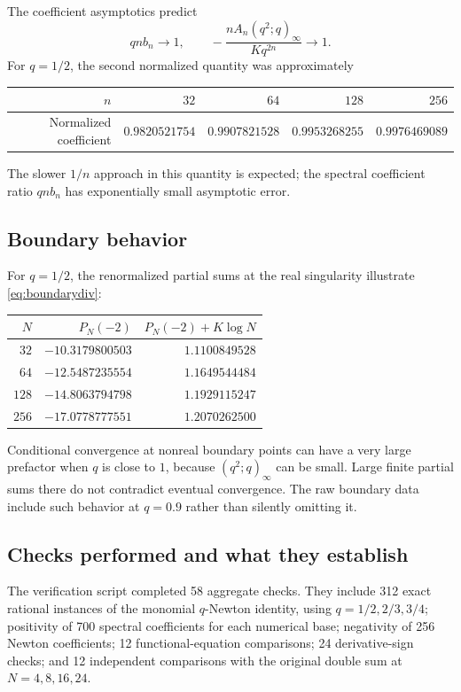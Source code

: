 \documentclass[11pt,letterpaper]{article}
\theoremstyle{definition}\newtheorem{definition}[theorem]{Definition}
\theoremstyle{remark}\newtheorem{remark}[theorem]{Remark}
\numberwithin{equation}{section}
\begin{document}
The coefficient asymptotics predict
\[
 qnb_n\longrightarrow1,\qquad
 -\frac{nA_n(q^2;q)_\infty}{Kq^{2n}}\longrightarrow1.
\]
For $q=1/2$, the second normalized quantity was approximately
\begin{center}
\begin{tabular}{@{}rrrrr@{}}
\toprule
$n$ & $32$ & $64$ & $128$ & $256$\\
\midrule
Normalized coefficient & $0.9820521754$ & $0.9907821528$ & $0.9953268255$ & $0.9976469089$\\
\bottomrule
\end{tabular}
\end{center}
The slower $1/n$ approach in this quantity is expected; the spectral coefficient ratio $qnb_n$ has exponentially small asymptotic error.

\subsection{Boundary behavior}
For $q=1/2$, the renormalized partial sums at the real singularity illustrate \eqref{eq:boundarydiv}:
\begin{center}
\begin{tabular}{@{}rrr@{}}
\toprule
$N$ & $P_N(-2)$ & $P_N(-2)+K\log N$\\
\midrule
$32$ & $-10.3179800503$ & $1.1100849528$\\
$64$ & $-12.5487235554$ & $1.1649544484$\\
$128$ & $-14.8063794798$ & $1.1929115247$\\
$256$ & $-17.0778777551$ & $1.2070262500$\\
\bottomrule
\end{tabular}
\end{center}
Conditional convergence at nonreal boundary points can have a very large prefactor when $q$ is close to $1$, because $(q^2;q)_\infty$ can be small. Large finite partial sums there do not contradict eventual convergence. The raw boundary data include such behavior at $q=0.9$ rather than silently omitting it.

\subsection{Checks performed and what they establish}
The verification script completed 58 aggregate checks. They include 312 exact rational instances of the monomial $q$-Newton identity, using $q=1/2,2/3,3/4$; positivity of 700 spectral coefficients for each numerical base; negativity of 256 Newton coefficients; 12 functional-equation comparisons; 24 derivative-sign checks; and 12 independent comparisons with the original double sum at $N=4,8,16,24$.
\end{document}
